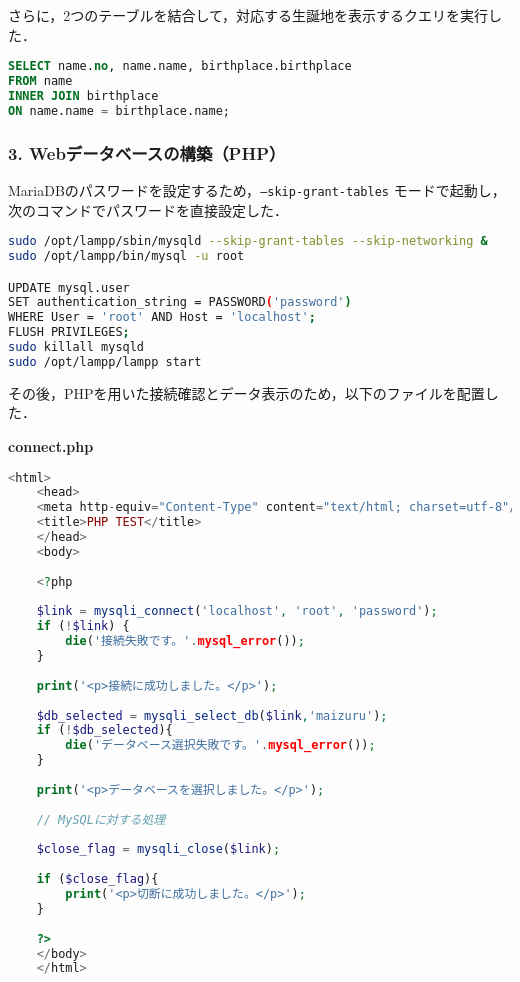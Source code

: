 さらに，2つのテーブルを結合して，対応する生誕地を表示するクエリを実行した．

\begin{lstlisting}[language=SQL]
SELECT name.no, name.name, birthplace.birthplace 
FROM name 
INNER JOIN birthplace 
ON name.name = birthplace.name;
\end{lstlisting}

\subsubsection*{3. Webデータベースの構築（PHP）}

MariaDBのパスワードを設定するため，\texttt{--skip-grant-tables} モードで起動し，次のコマンドでパスワードを直接設定した．

\begin{lstlisting}[language=bash]
sudo /opt/lampp/sbin/mysqld --skip-grant-tables --skip-networking &
sudo /opt/lampp/bin/mysql -u root

UPDATE mysql.user 
SET authentication_string = PASSWORD('password') 
WHERE User = 'root' AND Host = 'localhost';
FLUSH PRIVILEGES;
sudo killall mysqld
sudo /opt/lampp/lampp start
\end{lstlisting}

その後，PHPを用いた接続確認とデータ表示のため，以下のファイルを配置した．

\textbf{connect.php}
\begin{lstlisting}[language=php]
    <html>
    <head>
    <meta http-equiv="Content-Type" content="text/html; charset=utf-8"/>
    <title>PHP TEST</title>
    </head>
    <body>
    
    <?php
    
    $link = mysqli_connect('localhost', 'root', 'password');
    if (!$link) {
        die('接続失敗です。'.mysql_error());
    }
    
    print('<p>接続に成功しました。</p>');
    
    $db_selected = mysqli_select_db($link,'maizuru');
    if (!$db_selected){
        die('データベース選択失敗です。'.mysql_error());
    }
    
    print('<p>データベースを選択しました。</p>');
    
    // MySQLに対する処理
    
    $close_flag = mysqli_close($link);
    
    if ($close_flag){
        print('<p>切断に成功しました。</p>');
    }
    
    ?>
    </body>
    </html>
\end{lstlisting}

